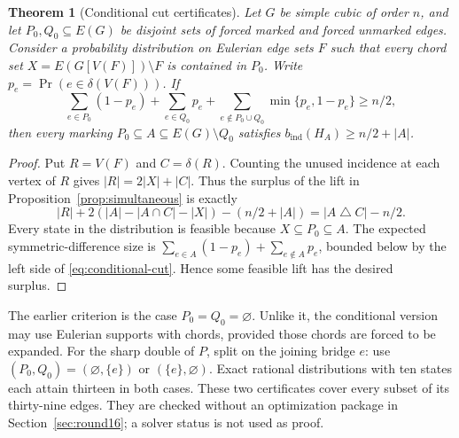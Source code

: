 \documentclass[11pt]{article}
\newtheorem{theorem}{Theorem}[section]
\newcommand{\bind}{b_{\mathrm{ind}}}
\begin{document}
\begin{theorem}[Conditional cut certificates]\label{thm:conditional-cut}
Let $G$ be simple cubic of order $n$, and let $P_0,Q_0\subseteq E(G)$
be disjoint sets of forced marked and forced unmarked edges.
Consider a probability distribution on Eulerian edge sets $F$ such
that every chord set $X=E(G[V(F)])\setminus F$ is contained in $P_0$.
Write $p_e=\Pr(e\in\delta(V(F)))$. If
\begin{equation}\label{eq:conditional-cut}
 \sum_{e\in P_0}(1-p_e)+\sum_{e\in Q_0}p_e+
 \sum_{e\notin P_0\cup Q_0}\min\{p_e,1-p_e\}\geq n/2,
\end{equation}
then every marking $P_0\subseteq A\subseteq E(G)\setminus Q_0$
satisfies $\bind(H_A)\geq n/2+|A|$.
\end{theorem}
\begin{proof}
Put $R=V(F)$ and $C=\delta(R)$. Counting the unused incidence at
each vertex of $R$ gives $|R|=2|X|+|C|$. Thus the surplus of the
lift in Proposition~\ref{prop:simultaneous} is exactly
\begin{equation}\label{eq:cut-distance}
 |R|+2(|A|-|A\cap C|-|X|)-(n/2+|A|)
   =|A\mathbin{\triangle}C|-n/2.
\end{equation}
Every state in the distribution is feasible because $X\subseteq
P_0\subseteq A$. The expected symmetric-difference size is
$\sum_{e\in A}(1-p_e)+\sum_{e\notin A}p_e$, bounded below by
the left side of \eqref{eq:conditional-cut}. Hence some feasible
lift has the desired surplus.
\end{proof}

The earlier criterion is the case $P_0=Q_0=\varnothing$.
Unlike it, the conditional version may use Eulerian supports with
chords, provided those chords are forced to be expanded. For the
sharp double of $P$, split on the joining bridge $e$: use
$(P_0,Q_0)=(\varnothing,\{e\})$ or $(\{e\},\varnothing)$.
Exact rational distributions with ten states each attain thirteen
in both cases. These two certificates cover every subset of its
thirty-nine edges. They are checked without an optimization package
in Section~\ref{sec:round16}; a solver status is not used as proof.
\end{document}
